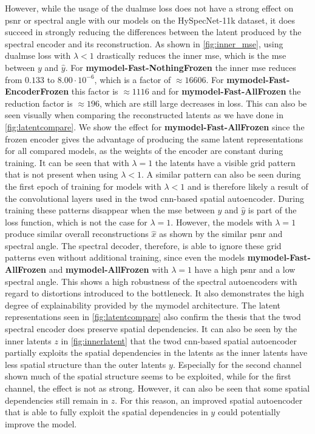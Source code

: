 However, while the usage of the \ac{dualmse} loss does not have a strong effect on \ac{psnr} or spectral angle with our models on the HySpecNet-11k dataset, it does succeed in strongly reducing the differences between the latent produced by the spectral encoder and its reconstruction. As shown in \autoref{fig:inner_mse}, using \ac{dualmse} loss with $\lambda < 1$ drastically reduces the inner \ac{mse}, which is the \ac{mse} between $y$ and $\hat{y}$. For \textbf{\ac{mymodel}-Fast-NothingFrozen} the inner \ac{mse} reduces from $0.133$ to $8.00\cdot 10^{-6}$, which is a factor of $\approx 16606$. For \textbf{\ac{mymodel}-Fast-EncoderFrozen} this factor is $\approx 1116$ and for \textbf{\ac{mymodel}-Fast-AllFrozen} the reduction factor is $\approx 196$, which are still large decreases in loss. This can also be seen visually when comparing the reconstructed latents as we have done in \autoref{fig:latentcompare}. We show the effect for \textbf{\ac{mymodel}-Fast-AllFrozen} since the frozen encoder gives the advantage of producing the same latent representations for all compared models, as the weights of the encoder are constant during training. It can be seen that with $\lambda=1$ the latents have a visible grid pattern that is not present when using $\lambda < 1$. A similar pattern can also be seen during the first epoch of training for models with $\lambda < 1$ and is therefore likely a result of the convolutional layers used in the \ac{twod} \ac{cnn}-based spatial autoencoder. During training these patterns disappear when the \ac{mse} between $y$ and $\hat{y}$ is part of the loss function, which is not the case for $\lambda=1$. However, the models with $\lambda=1$ produce similar overall reconstructions $\hat{x}$ as shown by the similar \ac{psnr} and spectral angle. The spectral decoder, therefore, is able to ignore these grid patterns even without additional training, since even the models \textbf{\ac{mymodel}-Fast-AllFrozen} and \textbf{\ac{mymodel}-AllFrozen} with $\lambda=1$ have a high \ac{psnr} and a low spectral angle. This shows a high robustness of the spectral autoencoders with regard to distortions introduced to the bottleneck. It also demonstrates the high degree of explainability provided by the \ac{mymodel} architecture. The latent representations seen in \autoref{fig:latentcompare} also confirm the thesis that the \ac{twod} spectral encoder does preserve spatial dependencies. It can also be seen by the inner latents $z$ in \autoref{fig:innerlatent} that the \ac{twod} \ac{cnn}-based spatial autoencoder partially exploits the spatial dependencies in the latents as the inner latents have less spatial structure than the outer latents $y$. Especially for the second channel shown much of the spatial structure seems to be exploited, while for the first channel, the effect is not as strong. However, it can also be seen that some spatial dependencies still remain in $z$. For this reason, an improved spatial autoencoder that is able to fully exploit the spatial dependencies in $y$ could potentially improve the model.

